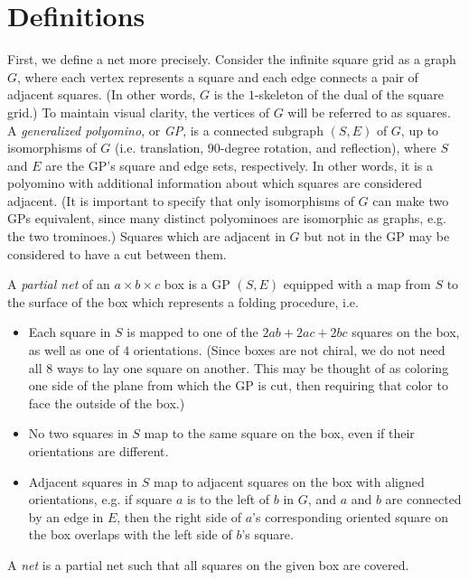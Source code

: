 \documentclass{article}
\begin{document}
\section{Definitions}

First, we define a net more precisely.
Consider the infinite square grid as a graph $G$,
where each vertex represents a square
and each edge connects a pair of adjacent squares.
(In other words, $G$ is the $1$-skeleton of
the dual of the square grid.)
To maintain visual clarity,
the vertices of $G$ will be referred to as squares.
A \textit{generalized polyomino}, or \textit{GP},
is a connected subgraph $(S, E)$ of $G$,
up to isomorphisms of $G$
(i.e. translation, $90$-degree rotation, and reflection),
where $S$ and $E$ are the GP's square and edge sets, respectively.
In other words, it is a polyomino
with additional information about which squares are considered adjacent.
(It is important to specify that
only isomorphisms of $G$ can make two GPs equivalent,
since many distinct polyominoes are isomorphic as graphs,
e.g. the two trominoes.)
Squares which are adjacent in $G$ but not in the GP
may be considered to have a cut between them.


A \textit{partial net} of an $a \times b \times c$ box
is a GP $(S, E)$
equipped with a map from $S$ to the surface of the box
which represents a folding procedure, i.e.
\begin{itemize}
\item
  Each square in $S$ is mapped to one of the $2ab+2ac+2bc$ squares on the box,
  as well as one of $4$ orientations.
  (Since boxes are not chiral,
  we do not need all $8$ ways to lay one square on another.
  This may be thought of as coloring one side of the plane
  from which the GP is cut,
  then requiring that color to face the outside of the box.)
\item
  No two squares in $S$ map to the same square on the box,
  even if their orientations are different.
\item
  Adjacent squares in $S$ map to adjacent squares on the box
  with aligned orientations,
  e.g. if square $a$ is to the left of $b$ in $G$,
  and $a$ and $b$ are connected by an edge in $E$,
  then the right side of $a$'s corresponding oriented square on the box
  overlaps with the left side of $b$'s square.
\end{itemize}
A \textit{net} is a partial net such that all squares on the given box are covered.
\end{document}
